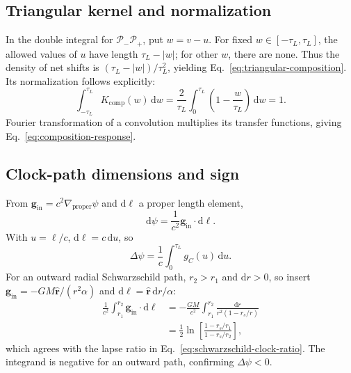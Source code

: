 \documentclass[12pt]{article}
\begin{document}
\subsection{Triangular kernel and normalization}

In the double integral for $\mathcal{P}_{-}\mathcal{P}_{+}$, put $w=v-u$. For fixed $w\in[-\tau_L,\tau_L]$, the allowed values of $u$ have length $\tau_L-|w|$; for other $w$, there are none. Thus the density of net shifts is $(\tau_L-|w|)/\tau_L^2$, yielding Eq.~\eqref{eq:triangular-composition}. Its normalization follows explicitly:
\begin{equation}
  \int_{-\tau_L}^{\tau_L}K_{\mathrm{comp}}(w)\,\mathrm{d}w
  =\frac{2}{\tau_L}\int_0^{\tau_L}
    \left(1-\frac{w}{\tau_L}\right)\,\mathrm{d}w
  =1.
  \label{eq:appendix-kernel-normalization}
\end{equation}
Fourier transformation of a convolution multiplies its transfer functions, giving Eq.~\eqref{eq:composition-response}.

\subsection{Clock-path dimensions and sign}

From $\mathbf{g}_{\mathrm{in}}=c^2\nabla_{\mathrm{proper}}\psi$ and $\mathrm{d}\ell$ a proper length element,
\begin{equation}
  \mathrm{d}\psi
  =\frac{1}{c^2}\mathbf{g}_{\mathrm{in}}\cdot\mathrm{d}\boldsymbol{\ell}.
  \label{eq:appendix-dpsi-element}
\end{equation}
With $u=\ell/c$, $\mathrm{d}\ell=c\,\mathrm{d}u$, so
\begin{equation}
  \Delta\psi=\frac{1}{c}\int_0^{\tau_L}g_C(u)\,\mathrm{d}u.
  \label{eq:appendix-path-substitution}
\end{equation}
For an outward radial Schwarzschild path, $r_2>r_1$ and $\mathrm{d}r>0$, so insert $\mathbf{g}_{\mathrm{in}}=-GM\hat{\mathbf r}/(r^2\alpha)$ and $\mathrm{d}\boldsymbol{\ell}=\hat{\mathbf r}\,\mathrm{d}r/\alpha$:
\begin{align}
  \frac{1}{c^2}\int_{r_1}^{r_2}
    \mathbf{g}_{\mathrm{in}}\cdot\mathrm{d}\boldsymbol{\ell}
  &=-\frac{GM}{c^2}\int_{r_1}^{r_2}
    \frac{\mathrm{d}r}{r^2(1-r_s/r)} \\
  &=\frac{1}{2}\ln\!\left[
    \frac{1-r_s/r_1}{1-r_s/r_2}\right],
  \label{eq:appendix-schwarzschild-integral}
\end{align}
which agrees with the lapse ratio in Eq.~\eqref{eq:schwarzschild-clock-ratio}. The integrand is negative for an outward path, confirming $\Delta\psi<0$.
\end{document}
